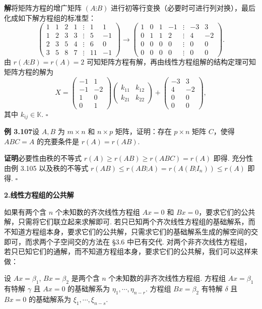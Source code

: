 \documentclass[UTF8,12pt,a4paper,fontset=fandol]{ctexart}
\begin{document}
\noindent\textbf{解}\quad 将矩阵方程的增广矩阵 $(A\vdots B)$ 进行初等行变换（必要时可进行列对换），最后化成如下解方程组的标准型：
\[
\begin{pmatrix}
1&1&2&1&\vdots&1&1\\
1&2&3&3&\vdots&5&-1\\
2&3&5&4&\vdots&6&0\\
3&5&8&7&\vdots&11&-1
\end{pmatrix}
\to
\begin{pmatrix}
1&0&1&-1&\vdots&-3&3\\
0&1&1&2&\vdots&4&-2\\
0&0&0&0&\vdots&0&0\\
0&0&0&0&\vdots&0&0
\end{pmatrix}.
\]
由 $r(A\vdots B)=r(A)=2$ 可知矩阵方程有解，再由线性方程组解的结构定理可知矩阵方程的解为
\[
X=\begin{pmatrix}
-1&1\\
-1&-2\\
1&0\\
0&1
\end{pmatrix}
\begin{pmatrix}
k_{11}&k_{12}\\
k_{21}&k_{22}
\end{pmatrix}
+
\begin{pmatrix}
-3&3\\
4&-2\\
0&0\\
0&0
\end{pmatrix},
\]
其中 $k_{ij}\in\mathbb{K}$. $\square$

\noindent\textbf{例 3.107}\quad 设 $A,B$ 为 $m\times n$ 和 $n\times p$ 矩阵，证明：存在 $p\times n$ 矩阵 $C$，使得 $ABC=A$ 的充要条件是 $r(A)=r(AB)$.

\noindent\textbf{证明}\quad 必要性由秩的不等式 $r(A)\ge r(AB)\ge r(ABC)=r(A)$ 即得. 充分性由例 3.105 以及秩的不等式 $r(AB)\le r(AB\vdots A)=r(A(B\vdots I_n))\le r(A)$ 即得. $\square$

\noindent\textbf{2.\quad 线性方程组的公共解}

如果有两个含 $n$ 个未知数的齐次线性方程组 $Ax=0$ 和 $Bx=0$，要求它们的公共解，只需将它们联立起来求解即可. 若只已知两个齐次线性方程组的基础解系，而不知道方程组本身，要求它们的公共解，只需求它们的基础解系生成的解空间的交即可，而求两个子空间交的方法在 §3.6 中已有交代. 对两个非齐次线性方程组，若只已知它们的通解，而不知道方程组本身，要求它们的公共解，我们可以这样来做：

设 $Ax=\beta_1$, $Bx=\beta_2$ 是两个含 $n$ 个未知数的非齐次线性方程组. 方程组 $Ax=\beta_1$ 有特解 $\gamma$ 且 $Ax=0$ 的基础解系为 $\eta_1,\cdots,\eta_{n-r}$. 方程组 $Bx=\beta_2$ 有特解 $\delta$ 且 $Bx=0$ 的基础解系为 $\xi_1,\cdots,\xi_{n-s}$.
\end{document}
